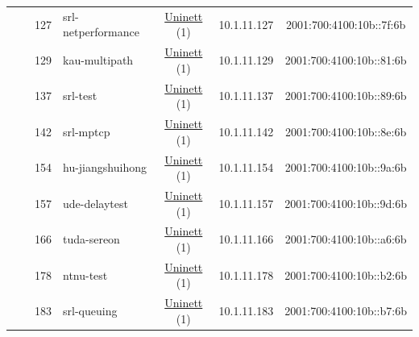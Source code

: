 \begin{small}
\begin{center}
\begin{longtable}{|c|c|c|c|c|c|c|c|}
  &  & \tiny{127} & \multicolumn{1}{|l|}{\tiny{srl-netperformance}} & \multicolumn{2}{|c|}{\tiny{\href{https://www.uninett.no}{Uninett} (1)}} & \tiny{10.1.11.127} & \tiny{2001:700:4100:10b::7f:6b} \\* \cline{3-3}\cline{4-4}\cline{5-5}\cline{6-6}\cline{7-7}\cline{8-8}
  &  & \tiny{129} & \multicolumn{1}{|l|}{\tiny{kau-multipath}} & \multicolumn{2}{|c|}{\tiny{\href{https://www.uninett.no}{Uninett} (1)}} & \tiny{10.1.11.129} & \tiny{2001:700:4100:10b::81:6b} \\* \cline{3-3}\cline{4-4}\cline{5-5}\cline{6-6}\cline{7-7}\cline{8-8}
  &  & \tiny{137} & \multicolumn{1}{|l|}{\tiny{srl-test}} & \multicolumn{2}{|c|}{\tiny{\href{https://www.uninett.no}{Uninett} (1)}} & \tiny{10.1.11.137} & \tiny{2001:700:4100:10b::89:6b} \\* \cline{3-3}\cline{4-4}\cline{5-5}\cline{6-6}\cline{7-7}\cline{8-8}
  &  & \tiny{142} & \multicolumn{1}{|l|}{\tiny{srl-mptcp}} & \multicolumn{2}{|c|}{\tiny{\href{https://www.uninett.no}{Uninett} (1)}} & \tiny{10.1.11.142} & \tiny{2001:700:4100:10b::8e:6b} \\* \cline{3-3}\cline{4-4}\cline{5-5}\cline{6-6}\cline{7-7}\cline{8-8}
  &  & \tiny{154} & \multicolumn{1}{|l|}{\tiny{hu-jiangshuihong}} & \multicolumn{2}{|c|}{\tiny{\href{https://www.uninett.no}{Uninett} (1)}} & \tiny{10.1.11.154} & \tiny{2001:700:4100:10b::9a:6b} \\* \cline{3-3}\cline{4-4}\cline{5-5}\cline{6-6}\cline{7-7}\cline{8-8}
  &  & \tiny{157} & \multicolumn{1}{|l|}{\tiny{ude-delaytest}} & \multicolumn{2}{|c|}{\tiny{\href{https://www.uninett.no}{Uninett} (1)}} & \tiny{10.1.11.157} & \tiny{2001:700:4100:10b::9d:6b} \\* \cline{3-3}\cline{4-4}\cline{5-5}\cline{6-6}\cline{7-7}\cline{8-8}
  &  & \tiny{166} & \multicolumn{1}{|l|}{\tiny{tuda-sereon}} & \multicolumn{2}{|c|}{\tiny{\href{https://www.uninett.no}{Uninett} (1)}} & \tiny{10.1.11.166} & \tiny{2001:700:4100:10b::a6:6b} \\* \cline{3-3}\cline{4-4}\cline{5-5}\cline{6-6}\cline{7-7}\cline{8-8}
  &  & \tiny{178} & \multicolumn{1}{|l|}{\tiny{ntnu-test}} & \multicolumn{2}{|c|}{\tiny{\href{https://www.uninett.no}{Uninett} (1)}} & \tiny{10.1.11.178} & \tiny{2001:700:4100:10b::b2:6b} \\* \cline{3-3}\cline{4-4}\cline{5-5}\cline{6-6}\cline{7-7}\cline{8-8}
  &  & \tiny{183} & \multicolumn{1}{|l|}{\tiny{srl-queuing}} & \multicolumn{2}{|c|}{\tiny{\href{https://www.uninett.no}{Uninett} (1)}} & \tiny{10.1.11.183} & \tiny{2001:700:4100:10b::b7:6b} \\* \cline{3-3}\cline{4-4}\cline{5-5}\cline{6-6}\cline{7-7}\cline{8-8}

\end{longtable}
\end{center}
\end{small}

